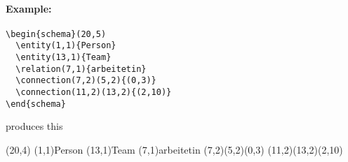 \documentclass[a4paper,11pt]{article}
\begin{document}
\paragraph{Example:}

\begin{verbatim}
\begin{schema}(20,5)
  \entity(1,1){Person}
  \entity(13,1){Team}
  \relation(7,1){arbeitetin}
  \connection(7,2)(5,2){(0,3)}
  \connection(11,2)(13,2){(2,10)}
\end{schema}
\end{verbatim}

produces this

\begin{schema}(20,4)
  \entity(1,1){Person}
  \entity(13,1){Team}
  \relation(7,1){arbeitetin}
  \connection(7,2)(5,2){(0,3)}
  \connection(11,2)(13,2){(2,10)}
\end{schema}
\end{document}
